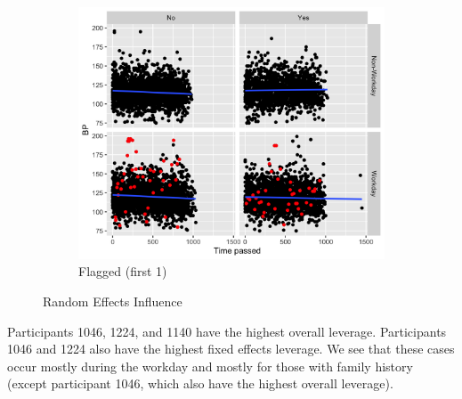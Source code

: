 \documentclass[12pt,twoside,letterpaper]{article}
\theoremstyle{definition}
\theoremstyle{definition}
\begin{document}
\begin{figure}[H]
\begin{subfigure}[b]{0.36\textwidth}
        \centering
        \includegraphics[width=\textwidth]{pics/rvc stand flagged.png}
        \caption[]%
        {{\small Flagged (first 1) }}
        \label{fig: rvc slope flagged}
        \end{subfigure}
    \caption[]
    {\small Random Effects Influence}
    \label{fig: rvc and flagged}
    \end{figure}

Participants 1046, 1224, and 1140 have the highest overall leverage. Participants 1046 and 1224 also have the highest fixed effects leverage. We see that these cases occur mostly during the workday and mostly for those with family history (except participant 1046, which also have the highest overall leverage). 
\end{document}
